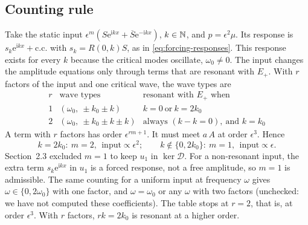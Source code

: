 \documentclass[11pt]{article}
\newcommand{\ii}{\mathrm{i}}
\newcommand{\ee}{\mathrm{e}}
\newcommand{\cD}{\mathcal{D}}
\newcommand{\cc}{\mathrm{c.c.}}
\begin{document}
\subsection{Counting rule}
Take the static input $\epsilon^m(S\ee^{\ii kx}+\overline S\ee^{-\ii kx})$,
$k\in\mathbb{N}$, and $p=\epsilon^2\mu$. Its response is
$s_k\ee^{\ii kx}+\cc$ with $s_k=R(0,k)S$, as in \eqref{eq:forcing-responses}.
This response exists for every $k$ because the critical modes oscillate,
$\omega_0\neq0$. The input
changes the amplitude equations only through terms that are resonant with
$E_+$. With $r$ factors of the input and one critical wave, the wave types are
\begin{equation*}
\begin{array}{c|c|c}
 r & \text{wave types} & \text{resonant with }E_+\text{ when}\\ \hline
 1 & (\omega_0,\ \pm k_0\pm k) & k=0\ \text{or}\ k=2k_0\\
 2 & (\omega_0,\ \pm k_0\pm k\pm k) & \text{always }(k-k=0),\ \text{and }k=k_0
\end{array}
\end{equation*}
A term with $r$ factors has order $\epsilon^{rm+1}$. It must meet $a\,A$ at
order $\epsilon^3$. Hence
\begin{equation}
 \boxed{k=2k_0:\ m=2,\ \ \text{input}\propto\epsilon^2;\qquad
 k\notin\{0,2k_0\}:\ m=1,\ \ \text{input}\propto\epsilon.}
 \label{eq:forcing-scaling}
\end{equation}
Section~2.3 excluded $m=1$ to keep $u_1$ in $\ker\cD$. For a non-resonant
input, the extra term $s_k\ee^{\ii kx}$ in $u_1$ is a forced response, not
a free amplitude, so $m=1$ is admissible. The same counting for a uniform
input at frequency $\omega$ gives $\omega\in\{0,2\omega_0\}$ with one factor,
and $\omega=\omega_0$ or any $\omega$ with two factors (unchecked: we have not
computed these coefficients). The table stops at $r=2$, that is, at order
$\epsilon^3$. With $r$ factors, $rk=2k_0$ is resonant at a higher order.
\end{document}
